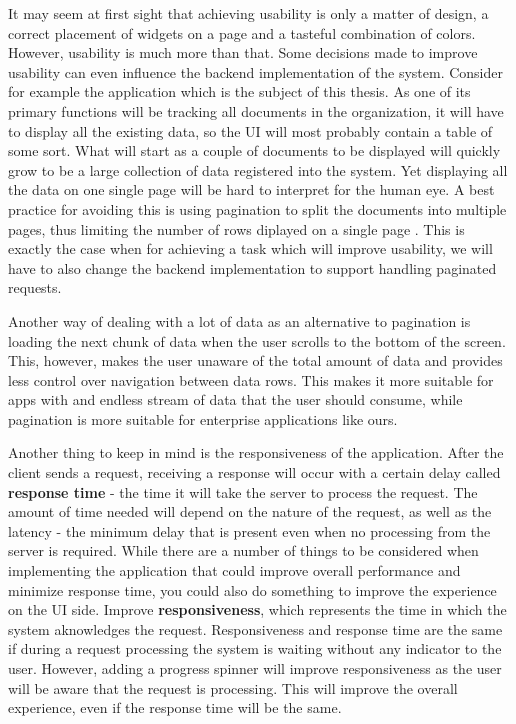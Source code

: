 It may seem at first sight that achieving usability is only a matter of design, a correct placement of widgets on a page and a tasteful combination of colors. However, usability is much more than that. Some decisions made to improve usability can even influence the backend implementation of the system. Consider for example the application which is the subject of this thesis. As one of its primary functions will be tracking all documents in the organization, it will have to display all the existing data, so the UI will most probably contain a table of some sort. What will start as a couple of documents to be displayed will quickly grow to be a large collection of data registered into the system. Yet displaying all the data on one single page will be hard to interpret for the human eye. A best practice for avoiding this is using pagination to split the documents into multiple pages, thus limiting the number of rows diplayed on a single page \cite{modernEnterpriseUiDesign}. This is exactly the case when for achieving a task which will improve usability, we will have to also change the backend implementation to support handling paginated requests.

Another way of dealing with a lot of data as an alternative to pagination is loading the next chunk of data when the user scrolls to the bottom of the screen. This, however, makes the user unaware of the total amount of data and provides less control over navigation between data rows. This makes it more suitable for apps with and endless stream of data that the user should consume, while pagination is more suitable for enterprise applications like ours.

Another thing to keep in mind is the responsiveness of the application. After the client sends a request, receiving a response will occur with a certain delay called \textbf{response time} - the time it will take the server to process the request. The amount of time needed will depend on the nature of the request, as well as the latency - the minimum delay that is present even when no processing from the server is required. While there are a number of things to be considered when implementing the application that could improve overall performance and minimize response time, you could also do something to improve the experience on the UI side. Improve \textbf{responsiveness}, which represents the time in which the system aknowledges the request. Responsiveness and response time are the same if during a request processing the system is waiting without any indicator to the user. However, adding a progress spinner will improve responsiveness as the user will be aware that the request is processing. This will improve the overall experience, even if the response time will be the same.
